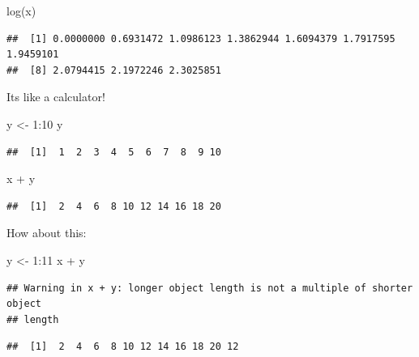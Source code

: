 \documentclass[
]{book}
\newenvironment{Shaded}{\begin{snugshade}}{\end{snugshade}}
\newcommand{\DecValTok}[1]{\textcolor[rgb]{0.00,0.00,0.81}{#1}}
\newcommand{\FunctionTok}[1]{\textcolor[rgb]{0.00,0.00,0.00}{#1}}
\newcommand{\NormalTok}[1]{#1}
\newcommand{\OtherTok}[1]{\textcolor[rgb]{0.56,0.35,0.01}{#1}}
\newcommand{\SpecialCharTok}[1]{\textcolor[rgb]{0.00,0.00,0.00}{#1}}
\theoremstyle{definition}
\theoremstyle{definition}
\theoremstyle{definition}
\theoremstyle{definition}
\theoremstyle{remark}
\begin{document}
\begin{Shaded}
\begin{Highlighting}[]
\FunctionTok{log}\NormalTok{(x)}
\end{Highlighting}
\end{Shaded}

\begin{verbatim}
##  [1] 0.0000000 0.6931472 1.0986123 1.3862944 1.6094379 1.7917595 1.9459101
##  [8] 2.0794415 2.1972246 2.3025851
\end{verbatim}

Its like a calculator!

\begin{Shaded}
\begin{Highlighting}[]
\NormalTok{y }\OtherTok{\textless{}{-}} \DecValTok{1}\SpecialCharTok{:}\DecValTok{10}
\NormalTok{y}
\end{Highlighting}
\end{Shaded}

\begin{verbatim}
##  [1]  1  2  3  4  5  6  7  8  9 10
\end{verbatim}

\begin{Shaded}
\begin{Highlighting}[]
\NormalTok{x }\SpecialCharTok{+}\NormalTok{ y}
\end{Highlighting}
\end{Shaded}

\begin{verbatim}
##  [1]  2  4  6  8 10 12 14 16 18 20
\end{verbatim}

How about this:

\begin{Shaded}
\begin{Highlighting}[]
\NormalTok{y }\OtherTok{\textless{}{-}} \DecValTok{1}\SpecialCharTok{:}\DecValTok{11}
\NormalTok{x }\SpecialCharTok{+}\NormalTok{ y}
\end{Highlighting}
\end{Shaded}

\begin{verbatim}
## Warning in x + y: longer object length is not a multiple of shorter object
## length
\end{verbatim}

\begin{verbatim}
##  [1]  2  4  6  8 10 12 14 16 18 20 12
\end{verbatim}
\end{document}
